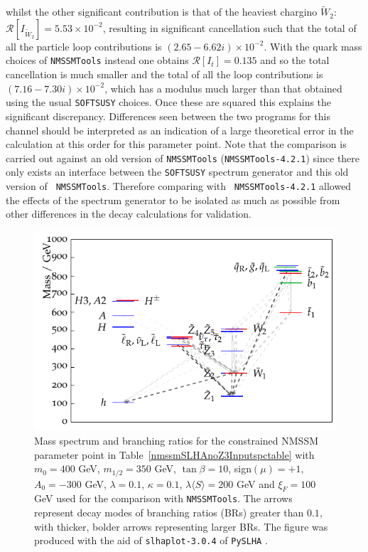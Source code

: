 \documentclass[final,3p,times,pdflatex]{elsarticle}
\begin{document}
whilst the other significant contribution is that of the heaviest chargino
$\tilde{W}_2$: $\mathcal{R}[I_{\tilde{W}_2}] = 5.53 \times 10^{-2}$, resulting
in significant cancellation such that the total of all the particle loop
contributions is $(2.65-6.62i) \times 10^{-2}$. With the quark mass choices of
{\tt NMSSMTools} instead one obtains $\mathcal{R}[I_t] = 0.135$ and so the
total cancellation is much smaller and the total of all the loop contributions
is $(7.16-7.30i) \times 10^{-2}$, which has a modulus much larger than that
obtained using the usual {\tt SOFTSUSY} choices. Once these are
squared this explains the significant discrepancy. Differences
seen between the two programs for this channel should be interpreted as an
indication of a large theoretical error in the calculation at this order for
this parameter point. 
Note that the comparison is carried out
against an old version of {\tt NMSSMTools} ({\tt NMSSMTools-4.2.1}) since 
there only exists an interface
between the  
{\tt SOFTSUSY} spectrum generator and this old version of {\tt
  NMSSMTools}. Therefore comparing with {\tt 
  NMSSMTools-4.2.1} allowed the effects of the spectrum 
generator to be isolated as much as possible from other differences in the
decay calculations for validation.  

\begin{figure} %
\centerline{\includegraphics[scale=1.2]{figure5}} 
\caption{Mass spectrum and branching ratios for the constrained NMSSM
  parameter point in Table~\protect\ref{nmssmSLHAnoZ3Inputspctable} with $m_0 =
  400$ GeV, $m_{1/2} = 350$ GeV, 
  $\tan\beta = 10$, sign$(\mu) = +1$, $A_0 = -300$ GeV, $\lambda = 0.1$,
  $\kappa = 
  0.1$, $\lambda \langle S \rangle = 200$ GeV and $\xi_F = 100$ GeV
used for the comparison with {\tt NMSSMTools}. The
  arrows represent decay modes of branching ratios (BRs) greater than
  $0.1$, with thicker, bolder arrows representing larger BRs. 
The figure was produced with the aid of {\tt slhaplot-3.0.4} of {\tt PySLHA}
\cite{Buckley:2013}. } \label{nmssmSLHAnoZ3Inputspectrum} 
\end{figure} 
\end{document}

